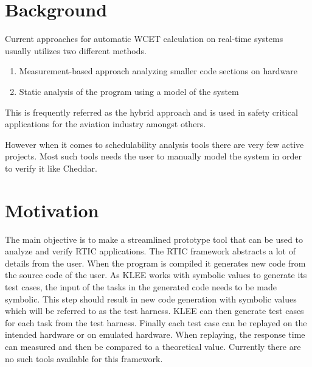 \section{Background}
Current approaches for automatic WCET calculation on real-time systems usually
utilizes two different methods.
\begin{enumerate}
    \item Measurement-based approach analyzing smaller code sections on hardware
    \item Static analysis of the program using a model of the system
\end{enumerate}
This is frequently referred as the hybrid approach and is used in safety critical
applications for the aviation industry\cite{rapita} amongst others.

However when it comes to schedulability analysis tools there are very few active
projects. Most such tools needs the user to manually model the system in order
to verify it like Cheddar\cite{cheddar}.



%


\section{Motivation}
The main objective is to make a streamlined prototype tool that can be used to
analyze and verify RTIC applications. The RTIC framework abstracts a lot of
details from the user. When the program is compiled it generates new code from
the source code of the user. As KLEE works with symbolic values to generate its
test cases, the input of the tasks in the generated code needs to be made
symbolic. This step should result in new code generation with symbolic values
which will be referred to as the test harness. KLEE can then generate test
cases for each task from the test harness. Finally each test case can be
replayed on the intended hardware or on emulated hardware. When replaying, the
response time can measured and then be compared to a theoretical value.
Currently there are no such tools available for this framework.

